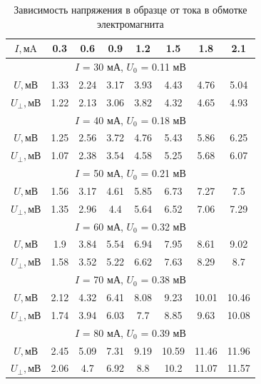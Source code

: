 \documentclass[a4paper, 10pt, twocolumn]{article}
\begin{document}
    \begin{table}[H] 
        \centering
        \begin{tabular}{|c|c|c|c|c|c|c|c|} \hline
        $I, \text{мA}$ & 0.3 & 0.6 & 0.9 & 1.2 & 1.5 & 1.8 & 2.1 \\ \hline
        \multicolumn{8}{|c|}{$I$ = 30 мА, $U_0$ = 0.11 мВ} \\ \hline
        $U, \text{мВ}$ & 1.33 & 2.24 & 3.17 & 3.93 & 4.43 & 4.76 & 5.04 \\ \hline
        $U_\bot, \text{мВ}$ & 1.22 & 2.13 & 3.06 & 3.82 & 4.32 & 4.65 & 4.93 \\ \hline
        \multicolumn{8}{|c|}{$I$ = 40 мА, $U_0$ = 0.18 мВ} \\ \hline
        $U, \text{мВ}$ & 1.25 & 2.56 & 3.72 & 4.76 & 5.43 & 5.86 & 6.25 \\ \hline
        $U_\bot, \text{мВ}$ & 1.07 & 2.38 & 3.54 & 4.58 & 5.25 & 5.68 & 6.07 \\ \hline
        \multicolumn{8}{|c|}{$I$ = 50 мА, $U_0$ = 0.21 мВ} \\ \hline
        $U, \text{мВ}$ & 1.56 & 3.17 & 4.61 & 5.85 & 6.73 & 7.27 & 7.5 \\ \hline
        $U_\bot, \text{мВ}$ & 1.35 & 2.96 & 4.4 & 5.64 & 6.52 & 7.06 & 7.29 \\ \hline
        \multicolumn{8}{|c|}{$I$ = 60 мА, $U_0$ = 0.32 мВ} \\ \hline
        $U, \text{мВ}$ & 1.9 & 3.84 & 5.54 & 6.94 & 7.95 & 8.61 & 9.02\\ \hline
        $U_\bot, \text{мВ}$ & 1.58 & 3.52 & 5.22 & 6.62 & 7.63 & 8.29 & 8.7 \\ \hline
        \multicolumn{8}{|c|}{$I$ = 70 мА, $U_0$ = 0.38 мВ} \\ \hline
        $U, \text{мВ}$ & 2.12 & 4.32 & 6.41 & 8.08 & 9.23 & 10.01 & 10.46\\ \hline
        $U_\bot, \text{мВ}$ & 1.74 & 3.94 & 6.03 & 7.7 & 8.85 & 9.63 & 10.08 \\ \hline
        \multicolumn{8}{|c|}{$I$ = 80 мА, $U_0$ = 0.39 мВ} \\ \hline
        $U, \text{мВ}$ & 2.45 & 5.09 & 7.31 & 9.19 & 10.59 & 11.46 & 11.96\\ \hline
        $U_\bot, \text{мВ}$ & 2.06 & 4.7 & 6.92 & 8.8 & 10.2 & 11.07 & 11.57 \\ \hline
        \end{tabular}
        \caption{Зависимость напряжения в образце от тока в обмотке электромагнита}
    \end{table}
\end{document}
